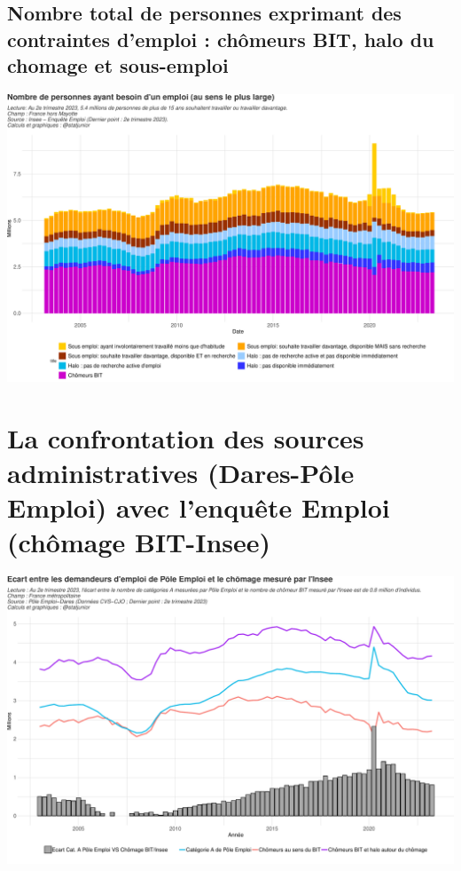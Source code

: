 \documentclass[
  paper=a4,
  ,captions=tableheading
]{scrartcl}
\begin{document}
\hypertarget{nombre-total-de-personnes-exprimant-des-contraintes-demploi-chuxf4meurs-bit-halo-du-chomage-et-sous-emploi}{%
\subsection{Nombre total de personnes exprimant des contraintes d'emploi
: chômeurs BIT, halo du chomage et
sous-emploi}\label{nombre-total-de-personnes-exprimant-des-contraintes-demploi-chuxf4meurs-bit-halo-du-chomage-et-sous-emploi}}

\includegraphics{rapport_activite_emploi_chomage_insee_files/figure-latex/unnamed-chunk-29-1.pdf}

\hypertarget{la-confrontation-des-sources-administratives-dares-puxf4le-emploi-avec-lenquuxeate-emploi-chuxf4mage-bit-insee}{%
\section{La confrontation des sources administratives (Dares-Pôle
Emploi) avec l'enquête Emploi (chômage
BIT-Insee)}\label{la-confrontation-des-sources-administratives-dares-puxf4le-emploi-avec-lenquuxeate-emploi-chuxf4mage-bit-insee}}

\includegraphics{rapport_activite_emploi_chomage_insee_files/figure-latex/unnamed-chunk-31-1.pdf}
\end{document}
